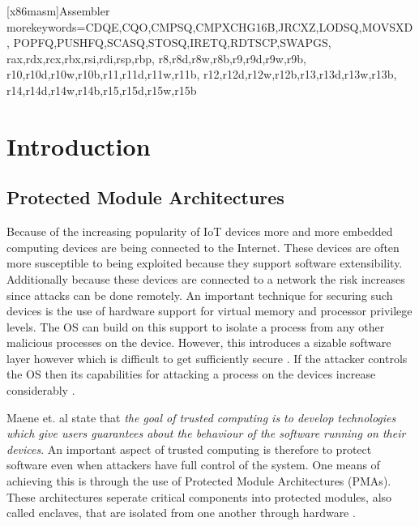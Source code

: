 
   [x86masm]{Assembler} %
   {morekeywords={CDQE,CQO,CMPSQ,CMPXCHG16B,JRCXZ,LODSQ,MOVSXD, %
                  POPFQ,PUSHFQ,SCASQ,STOSQ,IRETQ,RDTSCP,SWAPGS, %
                  rax,rdx,rcx,rbx,rsi,rdi,rsp,rbp, %
                  r8,r8d,r8w,r8b,r9,r9d,r9w,r9b, %
                  r10,r10d,r10w,r10b,r11,r11d,r11w,r11b, %
                  r12,r12d,r12w,r12b,r13,r13d,r13w,r13b, %
                  r14,r14d,r14w,r14b,r15,r15d,r15w,r15b}} %

\chapter{Introduction}
\label{cha:introduction}

\section{Protected Module Architectures}
Because of the increasing popularity of IoT devices more and more embedded computing devices are being connected to the Internet. 
These devices are often more susceptible to being exploited because they support software extensibility. 
Additionally because these devices are connected to a network the risk increases since attacks can be done remotely. 
An important technique for securing such devices is the use of hardware support for virtual memory and processor privilege levels.
The OS can build on this support to isolate a process from any other malicious processes on the device. 
However, this introduces a sizable software layer however which is difficult to get sufficiently secure \cite{psma}.
If the attacker controls the OS then its capabilities for attacking a process on the devices increase considerably \cite{citation needed}. 

Maene et. al state that \textit{the goal of trusted computing is to develop technologies which give users guarantees about the behaviour of the software running on their devices}.
An important aspect of trusted computing is therefore to protect software even when attackers have full control of the system. 
One means of achieving this is through the use of Protected Module Architectures (PMAs). 
These architectures seperate critical components into protected modules, also called enclaves,
that are isolated from one another through hardware \cite{trusted-computing-architectures}.  

